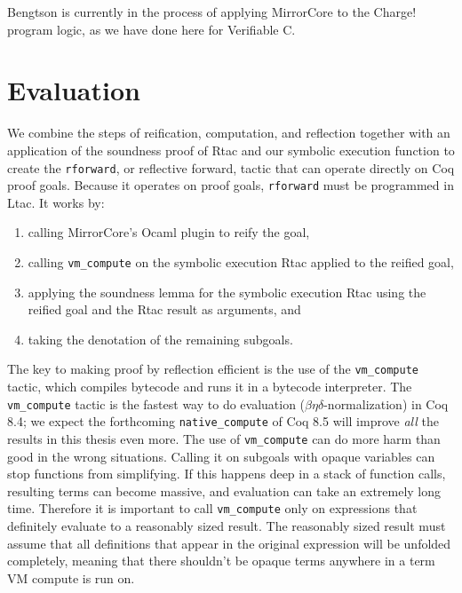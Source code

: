 \documentclass{puthesis}
\begin{document}
Bengtson is currently in the process of applying
MirrorCore to the Charge! program logic, as we have done here
for Verifiable C.

\chapter{Evaluation}
\label{ch:evaluation}
We combine the steps of reification, computation, and reflection
together with an application of the soundness proof of Rtac and our
symbolic execution function to create the \lstinline|rforward|, or
reflective forward, tactic that can operate directly on Coq proof
goals. Because it operates on proof goals, \lstinline|rforward| must
be programmed in Ltac.  It works by:
\begin{enumerate}
\item calling MirrorCore's Ocaml plugin to reify the goal,
\item calling \lstinline|vm_compute| on the symbolic execution Rtac
  applied to the reified goal,
\item applying the soundness lemma for the symbolic execution Rtac
  using the reified goal and the Rtac result as arguments, and
\item taking the denotation of the remaining subgoals.
\end{enumerate}
The key to making proof by reflection efficient is the use of the
\lstinline|vm_compute| tactic, which compiles bytecode and runs it in
a bytecode interpreter. The \lstinline|vm_compute| tactic is the
fastest way to do evaluation ($\beta\eta\delta$-normalization) in Coq
8.4; we expect the forthcoming \lstinline{native_compute} of Coq 8.5
will improve \emph{all} the results in this thesis even more.  The use
of \lstinline|vm_compute| can do more harm than good in the wrong
situations. Calling it on subgoals with opaque variables can stop
functions from simplifying. If this happens deep in a stack of
function calls, resulting terms can become massive, and evaluation can
take an extremely long time. Therefore it is important to call
\lstinline|vm_compute| only on expressions that definitely evaluate to
a reasonably sized result. The reasonably sized result must assume
that all definitions that appear in the original expression will be
unfolded completely, meaning that there shouldn't be opaque terms
anywhere in a term VM compute is run on.
  
\end{document}
